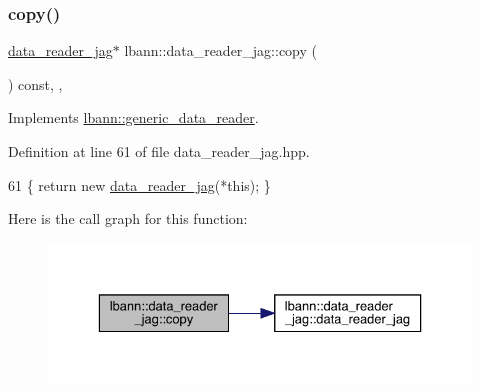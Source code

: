 \subsubsection{\texorpdfstring{copy()}{copy()}}
{\footnotesize\ttfamily \hyperlink{classlbann_1_1data__reader__jag}{data\+\_\+reader\+\_\+jag}$\ast$ lbann\+::data\+\_\+reader\+\_\+jag\+::copy (\begin{DoxyParamCaption}{ }\end{DoxyParamCaption}) const\hspace{0.3cm}{\ttfamily [inline]}, {\ttfamily [override]}, {\ttfamily [virtual]}}



Implements \hyperlink{classlbann_1_1generic__data__reader_a208ba1223e7aaa75e94b728501f12f86}{lbann\+::generic\+\_\+data\+\_\+reader}.



Definition at line 61 of file data\+\_\+reader\+\_\+jag.\+hpp.


\begin{DoxyCode}
61 \{ \textcolor{keywordflow}{return} \textcolor{keyword}{new} \hyperlink{classlbann_1_1data__reader__jag_a8729a52155d4a4319efb77b1b38bc369}{data\_reader\_jag}(*\textcolor{keyword}{this}); \}
\end{DoxyCode}
Here is the call graph for this function\+:\nopagebreak
\begin{figure}[H]
\begin{center}
\leavevmode
\includegraphics[width=329pt]{classlbann_1_1data__reader__jag_aa4c2d2536e32af08762cf159981631af_cgraph}
\end{center}
\end{figure}
\mbox{\label{classlbann_1_1data__reader__jag_a3b22313694b8ff258486491775100d89}} 
